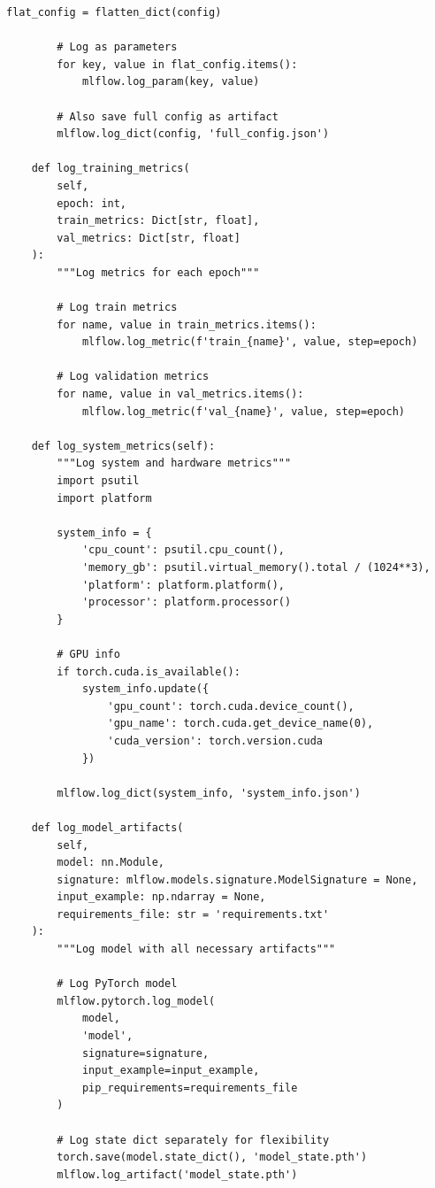 \begin{lstlisting}[style=python, caption=Comprehensive Experiment Tracking with MLflow]
        flat_config = flatten_dict(config)

        # Log as parameters
        for key, value in flat_config.items():
            mlflow.log_param(key, value)

        # Also save full config as artifact
        mlflow.log_dict(config, 'full_config.json')

    def log_training_metrics(
        self,
        epoch: int,
        train_metrics: Dict[str, float],
        val_metrics: Dict[str, float]
    ):
        """Log metrics for each epoch"""

        # Log train metrics
        for name, value in train_metrics.items():
            mlflow.log_metric(f'train_{name}', value, step=epoch)

        # Log validation metrics
        for name, value in val_metrics.items():
            mlflow.log_metric(f'val_{name}', value, step=epoch)

    def log_system_metrics(self):
        """Log system and hardware metrics"""
        import psutil
        import platform

        system_info = {
            'cpu_count': psutil.cpu_count(),
            'memory_gb': psutil.virtual_memory().total / (1024**3),
            'platform': platform.platform(),
            'processor': platform.processor()
        }

        # GPU info
        if torch.cuda.is_available():
            system_info.update({
                'gpu_count': torch.cuda.device_count(),
                'gpu_name': torch.cuda.get_device_name(0),
                'cuda_version': torch.version.cuda
            })

        mlflow.log_dict(system_info, 'system_info.json')

    def log_model_artifacts(
        self,
        model: nn.Module,
        signature: mlflow.models.signature.ModelSignature = None,
        input_example: np.ndarray = None,
        requirements_file: str = 'requirements.txt'
    ):
        """Log model with all necessary artifacts"""

        # Log PyTorch model
        mlflow.pytorch.log_model(
            model,
            'model',
            signature=signature,
            input_example=input_example,
            pip_requirements=requirements_file
        )

        # Log state dict separately for flexibility
        torch.save(model.state_dict(), 'model_state.pth')
        mlflow.log_artifact('model_state.pth')


\end{lstlisting}
